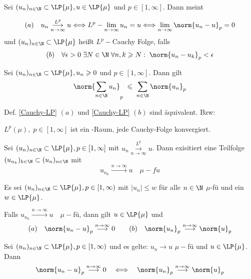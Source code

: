 \documentclass[11pt, a4paper]{article}
\begin{document}
\begin{definition}\label{Cauchy-LP}
    Sei $(u_n)_{n\in\N} \subset \LP{\mu}, u\in \LP{\mu}$ und $p\in [1,\infty]$. Dann meint

    $$(a) \quad u_n \overset{L^p}{\underset{n\to \infty}{\longrightarrow }}u\Longleftrightarrow L^p-\lim_{n\to \infty} u_n = u \Longleftrightarrow \lim_{n\to \infty} \norm{u_n -u}_p = 0$$
    und $(u_n)_{n\in \N}\subset \LP{\mu}$ heißt $L^p-$Cauchy Folge, falls
    $$(b) \quad \forall \epsilon > 0 \; \exists N\in \N \; \forall n,k\geqslant N: \; \norm{u_n -u_k}_p < \epsilon$$
\end{definition}

\begin{lemma}
    Sei $(u_n)_{n\in\N} \subset \LP{\mu}, u_n\geqslant 0$ und $p\in [1,\infty]$. Dann gilt
    $$\norm{\sum_{n\in \N} u_n}_p \;\leqslant \;\sum_{n\in \N} \norm{u_n}_p$$
\end{lemma}

\begin{theorem}
Def. \ref{Cauchy-LP} $(a)$ und \ref{Cauchy-LP} $(b)$ sind äquivalent. Bzw:
\begin{center}
    $L^p(\mu), \; p\in [1,\infty]$ ist ein -Raum, jede Cauchy-Folge konvergiert.
\end{center}
\end{theorem}

\begin{corollary} Sei $(u_n)_{n\in\N} \subset \LP{\mu}, p\in [1,\infty]$ mit $u_n \overset{L^p}{\underset{n\to \infty}{\longrightarrow }}u$. 
Dann exisitiert eine Teilfolge $(u_{n_k})_{k\in \N}\subset (u_n)_{n\in \N}$ mit 
$$u_{n_k} \overset{n\to \infty}{\longrightarrow} u \quad \mu-fu$$
    
\end{corollary}

\begin{theorem}
Es sei $(u_n)_{n\in\N} \subset \LP{\mu}, p\in [1,\infty)$ mit $|u_n|\leqslant w$ für alle $n\in \N$ $\mu$-fü und ein $w\in \LP{\mu}$. \par Falls $u_{n_k} \overset{n\to \infty}{\longrightarrow} u \quad \mu-$fü, dann gilt $u\in \LP{\mu}$ und 
$$(a) \quad \norm{u_n - u}_p \overset{n\to \infty}{\longrightarrow} 0 \quad \quad (b) \quad \norm{u_n}_p \overset{n\to \infty}{\longrightarrow} \norm{u}_p$$
\end{theorem}

\begin{theorem} 

Sei $(u_n)_{n\in\N} \subset \LP{\mu}, p\in [1,\infty)$ und es gelte: $u_n \to u$ $\mu-$fü und $u\in \LP{\mu}$. Dann
$$\norm{u_n - u}_p \overset{n\to \infty}{\longrightarrow} 0  \quad \Longleftrightarrow \quad \norm{u_n}_p \overset{n\to \infty}{\longrightarrow} \norm{u}_p$$
    
\end{theorem}
\end{document}
